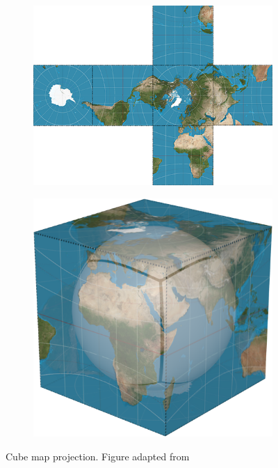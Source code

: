 \begin{figure}[htbp]
    \centering
    \begin{subfigure}[bt]{0.4\textwidth}
        \includegraphics[width=\textwidth]{figures/developable_projected/cube_map.png}
    \end{subfigure}
    \qquad
    \begin{subfigure}[bt]{0.15\textwidth}
        \includegraphics[width=\textwidth]{figures/map_projection/projection_cube.png}
    \end{subfigure}
    \caption{Cube map projection. Figure adapted from \cite{mapprojections}}
    \label{fig:proj_cube}
\end{figure}

